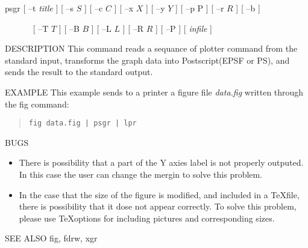 
\begin{synopsis}
 \item[psgr] [ --t {\em title} ] [ --s $S$ ] [ --c $C$ ] [ --x $X$ ]
[ --y $Y$ ] [ --p P ] [ --r $R$ ] [ --b ] 
\item[\ ~~~~~][ --T $T$ ] [ --B $B$ ]
[ --L $L$ ] [ --R $R$ ] [ --P ] [ {\em infile} ]
\end{synopsis}

\begin{qsection}{DESCRIPTION}
This command reads a sequance of plotter command
from the standard input, transforms the graph data into
Postscript(EPSF or PS), and sends the result to the standard output.
\end{qsection}

\begin{options}
\end{options}

\begin{qsection}{EXAMPLE}
This example sends to a printer a figure file {\em data.fig}
written through the fig command:
\begin{quote}
 \verb!fig data.fig | psgr | lpr!
\end{quote}
\end{qsection}

\begin{qsection}{BUGS}
\begin{itemize}
\item There is possibility that a part of the Y axies label
is not properly outputed. In this case the user can 
change the mergin to solve this problem.

\item In the case that the size of the figure is modified,
and included in a \TeX file, there is possibility that
it dose not appear correctly.
To solve this problem, please use \TeX options for including 
pictures and corresponding sizes.
\end{itemize}
\end{qsection}

\begin{qsection}{SEE ALSO}
 fig, fdrw, xgr
\end{qsection}
